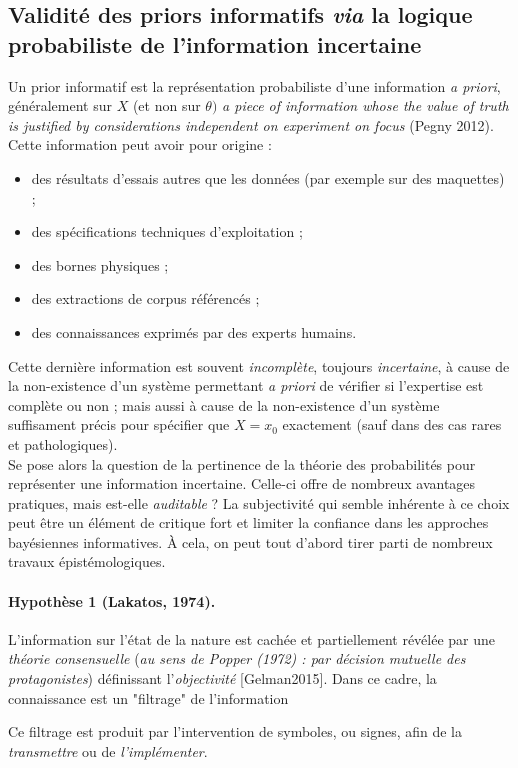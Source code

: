 \subsection{Validité des priors informatifs {\it via} la logique probabiliste de l'information incertaine}

Un prior informatif est la représentation probabiliste d'une information {\it a priori}, généralement sur $X$ (et non sur $\theta)$ {\it a piece of information  whose the value of truth is justified by considerations independent on experiment on focus} (Pegny 2012). Cette information peut avoir pour origine :
\begin{itemize}
\item des résultats d'essais autres que les données  (par exemple sur des maquettes) ;
\item des spécifications techniques d'exploitation ;
\item des bornes physiques ;
\item des extractions de corpus référencés ;
\item des connaissances exprimés par des experts humains. \\
\end{itemize}

Cette dernière information est souvent \emph{incomplète}, toujours \emph{incertaine},  à cause  de la non-existence d'un système permettant {\it a priori} de vérifier si l'expertise est complète ou non ; mais aussi à cause  de la non-existence d'un système suffisament précis pour spécifier que  $X=x_0$ exactement (sauf dans des cas rares et pathologiques). \\

Se pose alors la question de la pertinence de la théorie des probabilités pour représenter une information incertaine. Celle-ci offre de nombreux avantages pratiques, mais est-elle \emph{auditable} ? La subjectivité qui semble inhérente à ce choix peut être un élément de critique fort et limiter la confiance dans les approches bayésiennes informatives. \`A cela, on peut tout d'abord tirer parti de nombreux travaux épistémologiques. \\

\paragraph{Hypothèse 1 (Lakatos, 1974).} 
 L'information sur l'état de la nature est cachée et partiellement révélée par une \emph{théorie consensuelle} ({\it au sens de Popper  (1972) : par décision mutuelle des protagonistes}) définissant l'\emph{objectivité} {[{Gelman2015}]}.
Dans ce cadre,  la connaissance est un "filtrage" de l'information 
\item Ce filtrage est produit par l'intervention de symboles, ou signes, afin de la \emph{transmettre} ou de \emph{l'implémenter}.  \\



